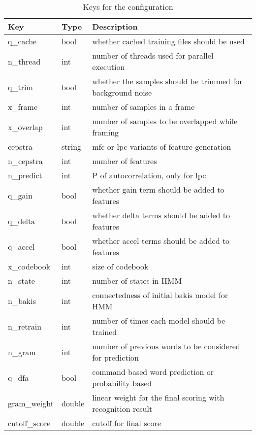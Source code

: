 \begin{enumerate}
\begin{table}[h!]
    \centering
    \begin{tabular}{lll}
        Key          & Type &    Description \\ \hline
        q\_cache     & bool &    whether cached training files should be used \\
        n\_thread    & int &     number of threads used for parallel execution \\
        q\_trim      & bool &    whether the samples should be trimmed for background noise \\
        x\_frame     & int &     number of samples in a frame \\
        x\_overlap   & int &     number of samples to be overlapped while framing \\
        cepstra     & string &   mfc or lpc variants of feature generation \\
        n\_cepstra   & int &     number of features \\
        n\_predict   & int &     P of autocorrelation, only for lpc \\
        q\_gain      & bool &    whether gain term should be added to features \\
        q\_delta     & bool &    whether delta terms should be added to features \\
        q\_accel     & bool &    whether accel terms should be added to features \\
        x\_codebook  & int &     size of codebook \\
        n\_state     & int &     number of states in HMM \\
        n\_bakis     & int &     connectedness of initial bakis model for HMM \\
        n\_retrain   & int &     number of times each model should be trained \\
        n\_gram      & int &     number of previous words to be considered for prediction \\
        q\_dfa       & bool &    command based word prediction or probability based \\
        gram\_weight & double &  linear weight for the final scoring with recognition result \\
        cutoff\_score & double &  cutoff for final score \\
    \end{tabular}
    \caption{Keys for the configuration}
\end{table}

\end{enumerate}

